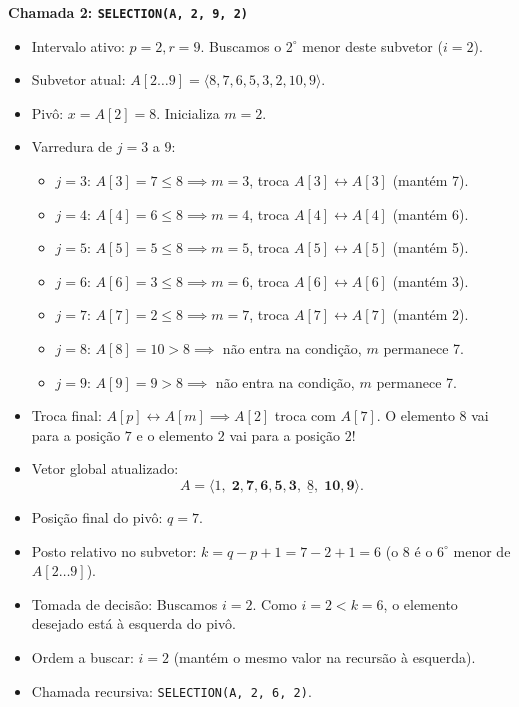 \documentclass[11pt,a4paper]{article}
\newcommand{\destaque}[1]{\textbf{\color{azul}#1}}
\begin{document}
\vspace{4pt}
\destaque{Chamada 2: \texttt{SELECTION(A, 2, 9, 2)}}
\begin{itemize}
    \item Intervalo ativo: $p = 2, r = 9$. Buscamos o $2^\circ$ menor deste subvetor ($i = 2$).
    \item Subvetor atual: $A[2 \dots 9] = \langle 8, 7, 6, 5, 3, 2, 10, 9 \rangle$.
    \item Pivô: $x = A[2] = 8$. Inicializa $m = 2$.
    \item Varredura de $j = 3$ a $9$:
    \begin{itemize}
        \item $j=3$: $A[3]=7 \le 8 \implies m=3$, troca $A[3] \leftrightarrow A[3]$ (mantém 7).
        \item $j=4$: $A[4]=6 \le 8 \implies m=4$, troca $A[4] \leftrightarrow A[4]$ (mantém 6).
        \item $j=5$: $A[5]=5 \le 8 \implies m=5$, troca $A[5] \leftrightarrow A[5]$ (mantém 5).
        \item $j=6$: $A[6]=3 \le 8 \implies m=6$, troca $A[6] \leftrightarrow A[6]$ (mantém 3).
        \item $j=7$: $A[7]=2 \le 8 \implies m=7$, troca $A[7] \leftrightarrow A[7]$ (mantém 2).
        \item $j=8$: $A[8]=10 > 8 \implies$ não entra na condição, $m$ permanece 7.
        \item $j=9$: $A[9]=9 > 8 \implies$ não entra na condição, $m$ permanece 7.
    \end{itemize}
    \item Troca final: $A[p] \leftrightarrow A[m] \implies A[2]$ troca com $A[7]$. O elemento $8$ vai para a posição $7$ e o elemento $2$ vai para a posição $2$!
    \item Vetor global atualizado:
    \[
    A = \langle 1, \;\mathbf{2, 7, 6, 5, 3},\; \underline{8},\; \mathbf{10, 9} \rangle.
    \]
    \item Posição final do pivô: $q = 7$.
    \item Posto relativo no subvetor: $k = q - p + 1 = 7 - 2 + 1 = 6$ (o $8$ é o $6^\circ$ menor de $A[2 \dots 9]$).
    \item Tomada de decisão: Buscamos $i = 2$. Como $i = 2 < k = 6$, o elemento desejado está à esquerda do pivô.
    \item Ordem a buscar: $i = 2$ (mantém o mesmo valor na recursão à esquerda).
    \item Chamada recursiva: \texttt{SELECTION(A, 2, 6, 2)}.
\end{itemize}
\end{document}
